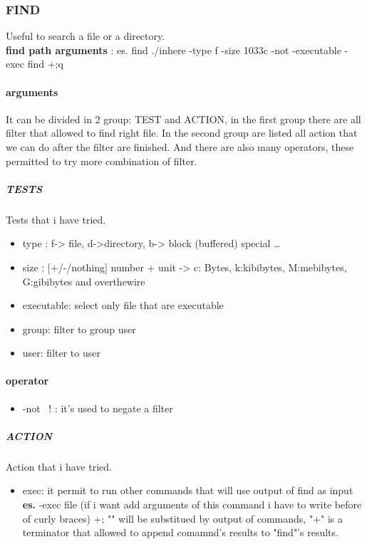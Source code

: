 \documentclass{article}
\begin{document}
                \subsubsection{FIND}
                    Useful to search a file or a directory.\\
                    \textbf{find path arguments} : es. find ./inhere -type f -size  1033c -not -executable -exec find {} +;q
                    \paragraph{arguments}
                    It can be divided in 2 group: TEST and ACTION, in the first group there are all filter that allowed to find right file. In the second group are listed all action that we can do after the filter are finished. 
                    And there are also many operators, these permitted to try more combination of filter.   
                    \subparagraph{TESTS}
                    Tests that i have tried.
                    \begin{itemize}
                        \item type : f-> file, d->directory, b-> block (buffered) special \dots
                        \item size : [+/-/nothing] number + unit -> c: Bytes, k:kibibytes, M:mebibytes, G:gibibytes and overthewire
                        \item executable: select only file that are executable   
                        \item group: filter to group user
                        \item user: filter to user
                    \end{itemize}
                    \paragraph{operator}
                    \begin{itemize}
                        \item -not \ ! : it's used to negate a filter
                    \end{itemize}
                    \subparagraph{ACTION}
                    Action that i have tried.
                    \begin{itemize}
                        \item exec: it permit to run other commands that will use output of find as input \textbf{es. } -exec file (if i want add arguments of this command i have to write before of curly braces){} +; "{}" will be substitued by output of commands, "+" is a terminator that allowed to append comamnd's results to "find"'s results. 
                    \end{itemize}
\end{document}
